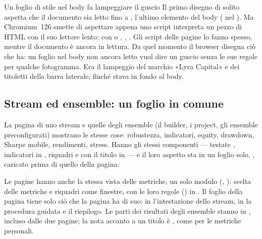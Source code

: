 \begin{attenzione}{Un foglio di stile nel body fa lampeggiare il guscio}
Il primo disegno di solito aspetta che il documento sia letto fino a
, l'ultimo elemento del body ( nel
). Ma Chromium~126 smette di aspettare appena uno script
interpreta un pezzo di HTML con il suo lettore lento:  con
 o , ,
. Gli script delle pagine lo fanno spesso,
mentre il documento è ancora in lettura. Da quel momento il browser disegna
ciò che ha: un foglio nel body non ancora letto vuol dire un guscio senza le
sue regole per qualche fotogramma. Era il lampeggio del marchio
«Lyra Capital» e dei titoletti della barra laterale, finché
 stava in fondo al body.
\end{attenzione}


\subsection{Stream ed ensemble: un foglio in comune}\label{sez:fogli-risultati}

La pagina di uno stream e quelle degli ensemble (il builder, i project, gli
ensemble preconfigurati) mostrano le stesse cose: robustezza, indicatori,
equity, drawdown, Sharpe mobile, rendimenti, stress. Hanno gli stessi
componenti --- testate , indicatori in
, riquadri  e
 con il titolo in  --- e il loro aspetto sta in
un foglio solo, , caricato prima di quello della pagina:


\noindent
Le pagine hanno anche la stessa vista delle metriche, un solo modulo
(, ): scelta delle
metriche e riquadri come finestre, con le loro regole () in
. Il foglio della pagina tiene solo ciò che la pagina
ha di suo: in  l'intestazione dello stream, in
 la procedura guidata e il riepilogo. Le parti dei
risultati degli ensemble stanno in , incluso
dalle due pagine; la nota accanto a un titolo è , come
 per le metriche personali.

